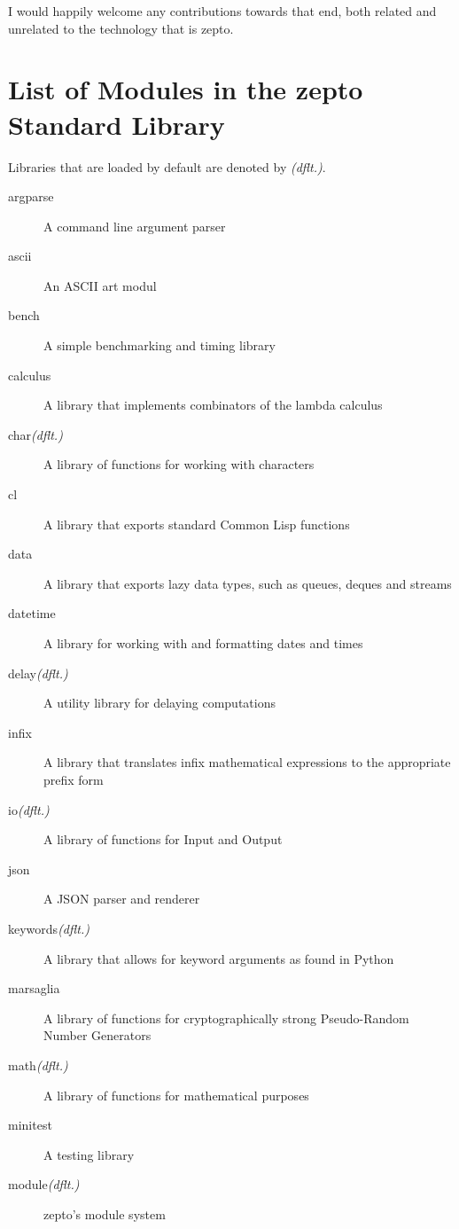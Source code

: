 \documentclass[oneside,11pt,xetex]{scrbook}
\begin{document}
I would happily welcome any contributions towards that
end, both related and unrelated to the technology
that is zepto.



\appendix

\chapter{List of Modules in the zepto Standard Library}
\label{app:stdlib}

Libraries that are loaded by default are denoted by \textit{(dflt.)}.

\begin{description}
\item [argparse] A command line argument parser
\item [ascii] An ASCII art modul
\item [bench] A simple benchmarking and timing library
\item [calculus] A library that implements combinators of the lambda calculus
\item [char\textit{(dflt.)}] A library of functions for working with characters
\item [cl] A library that exports standard Common Lisp functions
\item [data] A library that exports lazy data types, such as queues, deques and streams
\item [datetime] A library for working with and formatting dates and times
\item [delay\textit{(dflt.)}] A utility library for delaying computations
\item [infix] A library that translates infix mathematical expressions to the appropriate
prefix form
\item [io\textit{(dflt.)}] A library of functions for Input and Output
\item [json] A JSON parser and renderer
\item [keywords\textit{(dflt.)}] A library that allows for keyword arguments as found in Python
\item [marsaglia] A library of functions for cryptographically strong Pseudo-Random Number Generators
\item [math\textit{(dflt.)}] A library of functions for mathematical purposes
\item [minitest] A testing library
\item [module\textit{(dflt.)}] zepto's module system

\end{description}
\end{document}
